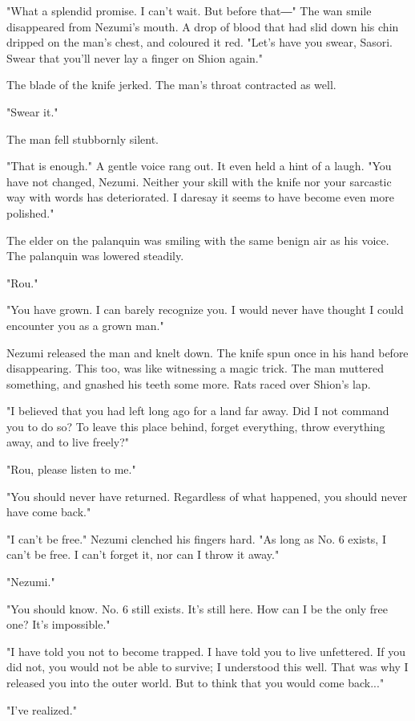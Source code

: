 "What a splendid promise. I can't wait. But before that―" The wan smile
disappeared from Nezumi's mouth. A drop of blood that had slid down his
chin dripped on the man's chest, and coloured it red. "Let's have you
swear, Sasori. Swear that you'll never lay a finger on Shion again."

The blade of the knife jerked. The man's throat contracted as well.

"Swear it."

The man fell stubbornly silent.

"That is enough." A gentle voice rang out. It even held a hint of a
laugh. "You have not changed, Nezumi. Neither your skill with the knife
nor your sarcastic way with words has deteriorated. I daresay it seems
to have become even more polished."

The elder on the palanquin was smiling with the same benign air as his
voice. The palanquin was lowered steadily.

"Rou."

"You have grown. I can barely recognize you. I would never have thought
I could encounter you as a grown man."

Nezumi released the man and knelt down. The knife spun once in his hand
before disappearing. This too, was like witnessing a magic trick. The
man muttered something, and gnashed his teeth some more. Rats raced over
Shion's lap.

"I believed that you had left long ago for a land far away. Did I not
command you to do so? To leave this place behind, forget everything,
throw everything away, and to live freely?"

"Rou, please listen to me."

"You should never have returned. Regardless of what happened, you should
never have come back."

"I can't be free." Nezumi clenched his fingers hard. "As long as No. 6
exists, I can't be free. I can't forget it, nor can I throw it away."

"Nezumi."

"You should know. No. 6 still exists. It's still here. How can I be the
only free one? It's impossible."

"I have told you not to become trapped. I have told you to live
unfettered. If you did not, you would not be able to survive; I
understood this well. That was why I released you into the outer world.
But to think that you would come back..."

"I've realized."

